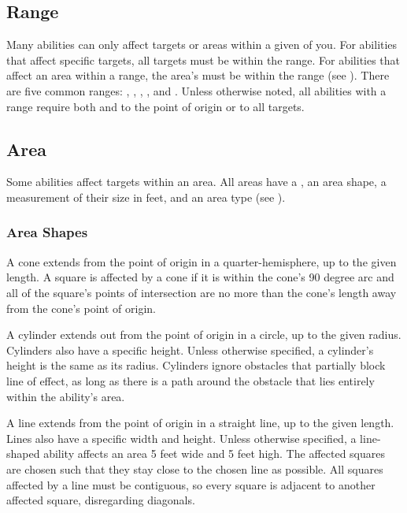     \subsection{Range}\label{Range}
        Many abilities can only affect targets or areas within a given  of you.
        For abilities that affect specific targets, all targets must be within the range.
        For abilities that affect an area within a range, the area's  must be within the range (see ).
        There are five common ranges: \shortrange, \medrange, \longrange, \distrange, and \extrange.
        Unless otherwise noted, all abilities with a range require both  and  to the point of origin or to all targets.

    \subsection{Area}\label{Area}

        Some abilities affect targets within an area.
        All areas have a , an area shape, a measurement of their size in feet, and an area type (see ).

        \subsubsection{Area Shapes}\label{Area Shapes}

             A cone extends from the point of origin in a quarter-hemisphere, up to the given length.
            A square is affected by a cone if it is within the cone's 90 degree arc and all of the square's points of intersection are no more than the cone's length away from the cone's point of origin.

             A cylinder extends out from the point of origin in a circle, up to the given radius.
            Cylinders also have a specific height.
            Unless otherwise specified, a cylinder's height is the same as its radius.
            Cylinders ignore obstacles that partially block line of effect, as long as there is a path around the obstacle that lies entirely within the ability's area.

             A line extends from the point of origin in a straight line, up to the given length.
            Lines also have a specific width and height.
            Unless otherwise specified, a line-shaped ability affects an area 5 feet wide and 5 feet high.
            The affected squares are chosen such that they stay close to the chosen line as possible.
            All squares affected by a line must be contiguous, so every square is adjacent to another affected square, disregarding diagonals.

